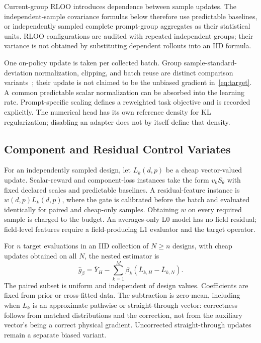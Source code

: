 Current-group RLOO introduces dependence between sample updates. The independent-sample covariance formulas below therefore use predictable baselines, or independently sampled complete prompt-group aggregates as their statistical units. RLOO configurations are audited with repeated independent groups; their variance is not obtained by substituting dependent rollouts into an IID formula.

One on-policy update is taken per collected batch. Group sample-standard-deviation normalization, clipping, and batch reuse are distinct comparison variants~\cite{schulman2017ppo,shao2024deepseekmath}; their update is not claimed to be the unbiased gradient in~\eqref{eq:target}. A common predictable scalar normalization can be absorbed into the learning rate. Prompt-specific scaling defines a reweighted task objective and is recorded explicitly. The numerical head has its own reference density for KL regularization; disabling an adapter does not by itself define that density.

\subsection{Component and Residual Control Variates}
For an independently sampled design, let $L_k(d,p)$ be a cheap vector-valued update. Scalar-reward and component-loss instances take the form $v_k S_\theta$ with fixed declared scales and predictable baselines. A residual-feature instance is $w(d,p)L_k(d,p)$, where the gate is calibrated before the batch and evaluated identically for paired and cheap-only samples. Obtaining $w$ on every required sample is charged to the budget. An averages-only L0 model has no field residual; field-level features require a field-producing L1 evaluator and the target operator.

For $n$ target evaluations in an IID collection of $N\ge n$ designs, with cheap updates obtained on all $N$, the nested estimator is
\begin{equation}
\widehat g_\beta=\overline Y_H-\sum_{k=1}^{M}\beta_k(\overline L_{k,H}-\overline L_{k,N}).
\label{eq:nested}
\end{equation}
The paired subset is uniform and independent of design values. Coefficients are fixed from prior or cross-fitted data. The subtraction is zero-mean, including when $L_k$ is an approximate pathwise or straight-through vector: correctness follows from matched distributions and the correction, not from the auxiliary vector's being a correct physical gradient. Uncorrected straight-through updates remain a separate biased variant.

